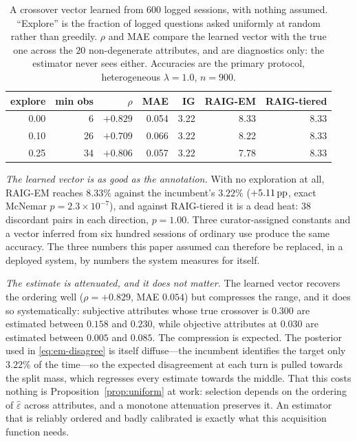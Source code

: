 \begin{table}[t]
\caption{A crossover vector learned from $600$ logged sessions, with nothing
assumed. ``Explore'' is the fraction of logged questions asked uniformly at
random rather than greedily. $\rho$ and MAE compare the learned vector with the
true one across the $20$ non-degenerate attributes, and are diagnostics only:
the estimator never sees either. Accuracies are the primary protocol,
heterogeneous $\lambda = 1.0$, $n = 900$.}
\label{tab:em}
\centering
\scriptsize
\begin{tabular}{@{}rrrrrrr@{}}
\toprule
\textbf{explore} & \textbf{min obs} & \textbf{$\rho$} & \textbf{MAE} &
\textbf{IG} & \textbf{RAIG-EM} & \textbf{RAIG-tiered} \\
\midrule
0.00 & 6  & $+0.829$ & 0.054 & 3.22 & 8.33 & 8.33 \\
0.10 & 26 & $+0.709$ & 0.066 & 3.22 & 8.22 & 8.33 \\
0.25 & 34 & $+0.806$ & 0.057 & 3.22 & 7.78 & 8.33 \\
\bottomrule
\end{tabular}
\end{table}

\emph{The learned vector is as good as the annotation.} With no exploration at
all, RAIG-EM reaches $8.33\%$ against the incumbent's $3.22\%$
($+5.11\,\text{pp}$, exact McNemar $p = 2.3\times10^{-7}$), and against RAIG-tiered it
is a dead heat: $38$ discordant pairs in each direction, $p = 1.00$. Three
curator-assigned constants and a vector inferred from six hundred sessions of
ordinary use produce the same accuracy. The three numbers this paper assumed can
therefore be replaced, in a deployed system, by numbers the system measures for
itself.

\emph{The estimate is attenuated, and it does not matter.} The learned vector
recovers the ordering well ($\rho = +0.829$, MAE $0.054$) but compresses the
range, and it does so systematically: subjective attributes whose true crossover
is $0.300$ are estimated between $0.158$ and $0.230$, while objective attributes
at $0.030$ are estimated between $0.005$ and $0.085$. The compression is
expected. The posterior used in \eqref{eq:em-disagree} is itself diffuse---the
incumbent identifies the target only $3.22\%$ of the time---so the expected
disagreement at each turn is pulled towards the split mass, which regresses
every estimate towards the middle. That this costs nothing is
Proposition~\ref{prop:uniform} at work: selection depends on the ordering of
$\hat\varepsilon$ across attributes, and a monotone attenuation preserves it.
An estimator that is reliably ordered and badly calibrated is exactly what this
acquisition function needs.

